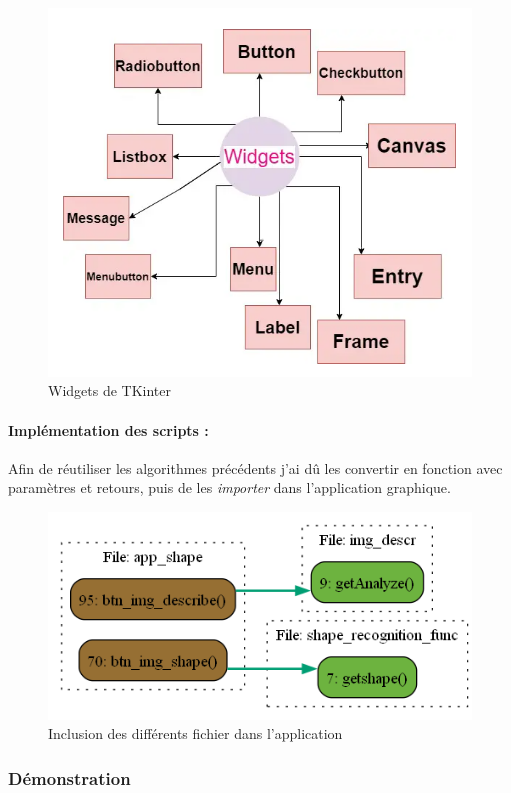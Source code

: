 \begin{figure}[h]
	\centering
	\includegraphics[width=0.5\linewidth]{Figures/TKinter_widgets}
	\caption{Widgets de TKinter}
	\label{fig:tkinterwidgets}
\end{figure}


\paragraph{Implémentation des scripts :} Afin de réutiliser les algorithmes précédents j'ai dû les convertir en fonction avec paramètres et retours, puis de les \textit{importer} dans l'application graphique.

\begin{figure}[h]
	\centering
	\includegraphics[width=0.56\linewidth]{Figures/flowchart-fichiers}
	\caption{Inclusion des différents fichier dans l'application}
	\label{fig:flowchart-fichiers}
\end{figure}


\clearpage
\subsubsection{Démonstration}

